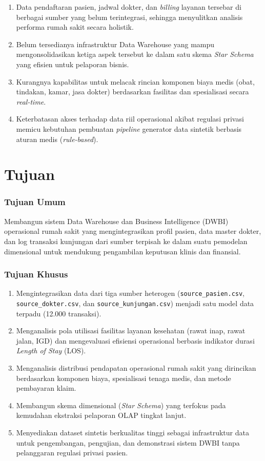 \begin{enumerate}
    \item Data pendaftaran pasien, jadwal dokter, dan \textit{billing} layanan tersebar di berbagai sumber yang belum terintegrasi, sehingga menyulitkan analisis performa rumah sakit secara holistik.
    \item Belum tersedianya infrastruktur Data Warehouse yang mampu mengonsolidasikan ketiga aspek tersebut ke dalam satu skema \textit{Star Schema} yang efisien untuk pelaporan bisnis.
    \item Kurangnya kapabilitas untuk melacak rincian komponen biaya medis (obat, tindakan, kamar, jasa dokter) berdasarkan fasilitas dan spesialisasi secara \textit{real-time}.
    \item Keterbatasan akses terhadap data riil operasional akibat regulasi privasi memicu kebutuhan pembuatan \textit{pipeline} generator data sintetik berbasis aturan medis (\textit{rule-based}).
\end{enumerate}
 
\section{Tujuan}
 
\subsubsection{Tujuan Umum}
 
Membangun sistem Data Warehouse dan Business Intelligence (DWBI) operasional rumah sakit yang mengintegrasikan profil pasien, data master dokter, dan log transaksi kunjungan dari sumber terpisah ke dalam suatu pemodelan dimensional untuk mendukung pengambilan keputusan klinis dan finansial.
 
\subsubsection{Tujuan Khusus}
 
\begin{enumerate}
    \item Mengintegrasikan data dari tiga sumber heterogen (\texttt{source\_pasien.csv}, \texttt{source\_dokter.csv}, dan \texttt{source\_kunjungan.csv}) menjadi satu model data terpadu (12.000 transaksi).
    \item Menganalisis pola utilisasi fasilitas layanan kesehatan (rawat inap, rawat jalan, IGD) dan mengevaluasi efisiensi operasional berbasis indikator durasi \textit{Length of Stay} (LOS).
    \item Menganalisis distribusi pendapatan operasional rumah sakit yang dirincikan berdasarkan komponen biaya, spesialisasi tenaga medis, dan metode pembayaran klaim.
    \item Membangun skema dimensional (\textit{Star Schema}) yang terfokus pada kemudahan ekstraksi pelaporan OLAP tingkat lanjut.
    \item Menyediakan dataset sintetis berkualitas tinggi sebagai infrastruktur data untuk pengembangan, pengujian, dan demonstrasi sistem DWBI tanpa pelanggaran regulasi privasi pasien.
\end{enumerate}